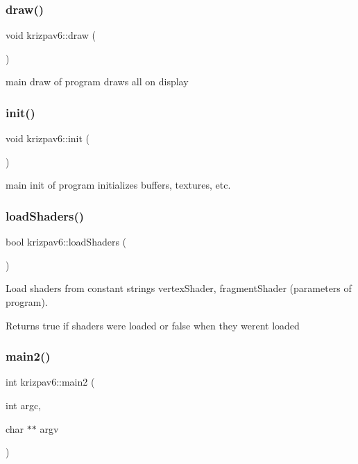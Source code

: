\subsubsection{\texorpdfstring{draw()}{draw()}}
{\footnotesize\ttfamily void krizpav6\+::draw (\begin{DoxyParamCaption}{ }\end{DoxyParamCaption})}

main draw of program draws all on display \mbox{\label{namespacekrizpav6_accd659c04e11a41feef1fbbcc3389608}} 
\subsubsection{\texorpdfstring{init()}{init()}}
{\footnotesize\ttfamily void krizpav6\+::init (\begin{DoxyParamCaption}{ }\end{DoxyParamCaption})}

main init of program initializes buffers, textures, etc. \mbox{\label{namespacekrizpav6_a83413961818b7cfa0c3ecf96ac0f3361}} 
\subsubsection{\texorpdfstring{loadShaders()}{loadShaders()}}
{\footnotesize\ttfamily bool krizpav6\+::load\+Shaders (\begin{DoxyParamCaption}{ }\end{DoxyParamCaption})}

Load shaders from constant strings vertex\+Shader, fragment\+Shader (parameters of program). \begin{DoxyReturn}{Returns}
true if shaders were loaded or false when they werent loaded 
\end{DoxyReturn}
\mbox{\label{namespacekrizpav6_af875a38a617fab4f65c59bb5521112bc}} 
\subsubsection{\texorpdfstring{main2()}{main2()}}
{\footnotesize\ttfamily int krizpav6\+::main2 (\begin{DoxyParamCaption}\item[{int}]{argc,  }\item[{char $\ast$$\ast$}]{argv }\end{DoxyParamCaption})}

